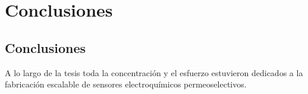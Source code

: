  \newcommand{\NoBiblioConc}[1]{
 \ifthenelse{\equal{#1}{verdadero}}{}{}
 \NoBiblioConc{verdadero}}

 	
 \FormatoCapituloUnaLinea
 
 \chapter{Conclusiones}
 \label{chap:Conclusiones}

 \thispagestyle{empty}
	


 \vfill
 \minitoc
 \newpage

\section*{Conclusiones}

A lo largo de la tesis toda la concentración y el esfuerzo estuvieron dedicados a la fabricación escalable de sensores electroquímicos permeoselectivos. 

